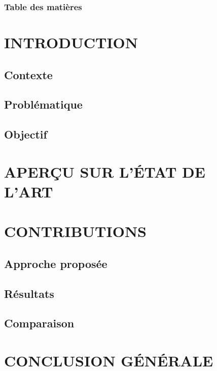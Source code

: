 \documentclass[aspectratio=169,professionalfonts, 12pt]{beamer}
\date{\today}
\begin{document}
\begin{frame}
	\titlepage
\end{frame}
\begin{frame}
	\frametitle{Table des matières}
    \begin{multicols}{2}
    \tableofcontents
    \end{multicols}
\end{frame}

\section{INTRODUCTION}

\subsection{Contexte}

\subsection{Problématique}

\subsection{Objectif}

\section{APERÇU SUR L'\'ETAT DE L'ART}

\section{CONTRIBUTIONS}

\subsection{Approche proposée}

\subsection{Résultats}

\subsection{Comparaison}

\section{CONCLUSION G\'EN\'ERALE}
\end{document}
